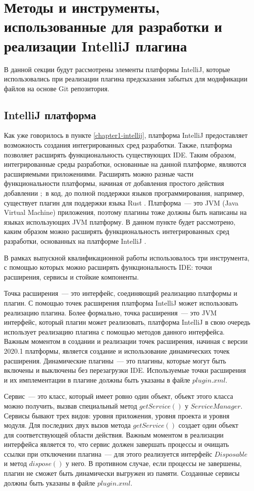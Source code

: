 \section{Методы и инструменты, использованные для разработки и реализации IntelliJ плагина}
В данной секции будут рассмотрены элементы платформы IntelliJ, которые использовались при реализации плагина предсказания забытых для модификации файлов на основе Git репозитория.
    \subsection{IntelliJ платформа}\label{ij-platform-req}
Как уже говорилось в пункте \ref{chapter1-intellij}, платформа IntelliJ предоставляет возможность создания интегрированных сред разработки. Также, платформа позволяет расширять функциональность существующих IDE. Таким образом, интегрированные среды разработки, основанные на данной платформе, являются расширяемыми приложениями. Расширять можно разные части функциональности платформы, начиная от добавления простого действия добавлении $;$ в код, до полной поддержки языков программирования, например, существует плагин для поддержки языка Rust \cite{rust}. Платформа~--- это JVM (Java Virtual Machine) приложения, поэтому плагины тоже должны быть написаны на языках использующих JVM платформу. В данном пункте будет рассмотрено, каким образом можно расширять функциональность интегрированных сред разработки, основанных на платформе IntelliJ \cite{intellij-sdk}.

В рамках выпускной квалификационной работы использовалось три инструмента, с помощью которых можно расширять функциональность IDE: точки расширения, сервисы и стойкие компоненты.

Точка расширения~--- это интерфейс, соединяющий реализацию платформы и плагин. С помощью точек расширения платформа IntelliJ может использовать реализацию плагина. Более формально, точка расширения~--- это JVM интерфейс, который плагин может реализовать, платформа IntelliJ в свою очередь использует реализацию плагина с помощью методов данного интерфейса. Важным моментом в создании и реализации точек расширения, начиная с версии 2020.1 платформы, является создание и использование динамических точек расширения. Динамические плагины~--- это плагины, которые могут быть включены и выключены без перезагрузки IDE. Используемые точки расширения и их имплементации в плагине должны быть указаны в файле $plugin.xml$.

Сервис~--- это класс, который имеет ровно один объект, объект этого класса можно получить, вызвав специальный метод $getService()$ у $ServiceManager$. Сервисы бывают трех видов: уровня приложения, уровня проекта и уровня модуля. Для последних двух вызов метода $getService()$ создает один объект для соответствующей области действия. Важным моментом в реализации интерфейса является то, что сервис должен завершать процессы и очищать ссылки при отключении плагина~--- для этого реализуется интерфейс $Disposable$ и метод $dispose()$ у него. В противном случае, если процессы не завершены, плагин не сможет быть динамически выгружен из памяти. Созданные сервисы должны быть указаны в файле $plugin.xml$.


